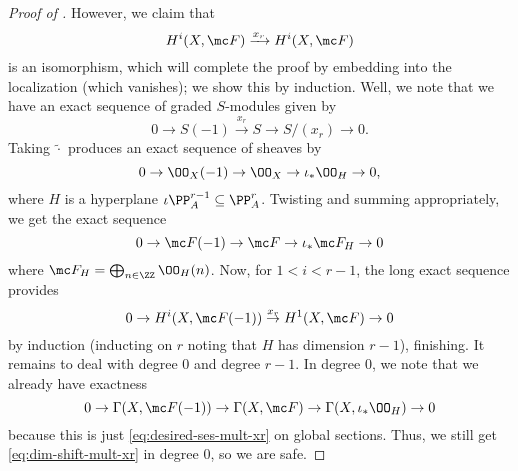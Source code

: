 \documentclass[../notes.tex]{subfiles}
\begin{document}
\begin{proof}[Proof of ]
	However, we claim that 
	\[H^i(X,\mc F)\xrightarrow{x_r}H^i(X,\mc F)\]
	is an isomorphism, which will complete the proof by embedding into the localization (which vanishes); we show this by induction. Well, we note that we have an exact sequence of graded $S$-modules given by
	\begin{equation}
		0\to S(-1)\stackrel{x_r}\to S\to S/(x_r)\to0. \label{eq:desired-ses-mult-xr}
	\end{equation}
	Taking $\widetilde\cdot$ produces an exact sequence of sheaves by
	\[0\to\OO_X(-1)\to\OO_X\to\iota_*\OO_H\to0,\]
	where $H$ is a hyperplane $\iota\PP^{r-1}_A\subseteq\PP^r_A$. Twisting and summing appropriately, we get the exact sequence
	\[0\to\mc F(-1)\to\mc F\to\iota_*\mc F_H\to0\]
	where $\mc F_H=\bigoplus_{n\in\ZZ}\OO_H(n)$. Now, for $1<i<r-1$, the long exact sequence provides
	\begin{equation}
		0\to H^i(X,\mc F(-1))\stackrel{x_r}\to H^1(X,\mc F)\to0 \label{eq:dim-shift-mult-xr}
	\end{equation}
	by induction (inducting on $r$ noting that $H$ has dimension $r-1$), finishing. It remains to deal with degree $0$ and degree $r-1$. In degree $0$, we note that we already have exactness
	\[0\to\Gamma(X,\mc F(-1))\to\Gamma(X,\mc F)\to\Gamma(X,\iota_*\OO_H)\to0\]
	because this is just \eqref{eq:desired-ses-mult-xr} on global sections. Thus, we still get \eqref{eq:dim-shift-mult-xr} in degree $0$, so we are safe.


\end{proof}
\end{document}
